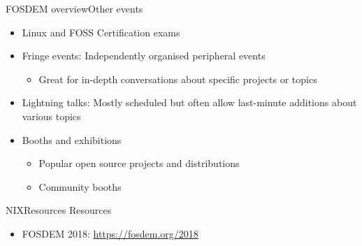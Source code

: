 \documentclass[10pt]{beamer}
\begin{document}
\begin{frame}{FOSDEM overview}{Other events}
    \begin{itemize}
        \item Linux and FOSS Certification exams
        \item Fringe events: Independently organised peripheral events
            \begin{itemize}
                \item Great for in-depth conversations about specific projects or topics
            \end{itemize}
        \item Lightning talks: Mostly scheduled but often allow last-minute additions about various topics
        \item Booths and exhibitions
        \begin{itemize}
            \item Popular open source projects and distributions
            \item Community booths
        \end{itemize}
    \end{itemize}
\end{frame}

\begin{frame}{NIX}{Resources}
    Resources

    \begin{itemize}
        \item FOSDEM 2018: \url{https://fosdem.org/2018}
    \end{itemize}
\end{frame}
\end{document}
